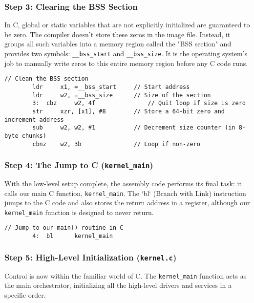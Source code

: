 \documentclass[a4paper, 11pt]{article}
\begin{document}
	\subsubsection{Step 3: Clearing the BSS Section}
	In C, global or static variables that are not explicitly initialized are guaranteed to be zero. The compiler doesn't store these zeros in the image file. Instead, it groups all such variables into a memory region called the "BSS section" and provides two symbols: \texttt{\_\_bss\_start} and \texttt{\_\_bss\_size}. It is the operating system's job to manually write zeros to this entire memory region before any C code runs.
	
	\begin{lstlisting}[style=cstyle, language={ }, caption={Zeroing out the BSS section.}]
		// Clean the BSS section
		ldr     x1, =__bss_start     // Start address
		ldr     w2, =__bss_size      // Size of the section
		3:  cbz     w2, 4f               // Quit loop if size is zero
		str     xzr, [x1], #8        // Store a 64-bit zero and increment address
		sub     w2, w2, #1           // Decrement size counter (in 8-byte chunks)
		cbnz    w2, 3b               // Loop if non-zero
	\end{lstlisting}
	
	\subsubsection{Step 4: The Jump to C (\texttt{kernel\_main})}
	With the low-level setup complete, the assembly code performs its final task: it calls our main C function, \texttt{kernel\_main}. The `bl` (Branch with Link) instruction jumps to the C code and also stores the return address in a register, although our \texttt{kernel\_main} function is designed to never return.
	
	\begin{lstlisting}[style=cstyle, language={ }, caption={Calling the C kernel.}]
		// Jump to our main() routine in C
		4:  bl      kernel_main
	\end{lstlisting}
	
	\subsubsection{Step 5: High-Level Initialization (\texttt{kernel.c})}
	Control is now within the familiar world of C. The \texttt{kernel\_main} function acts as the main orchestrator, initializing all the high-level drivers and services in a specific order.
	
\end{document}
